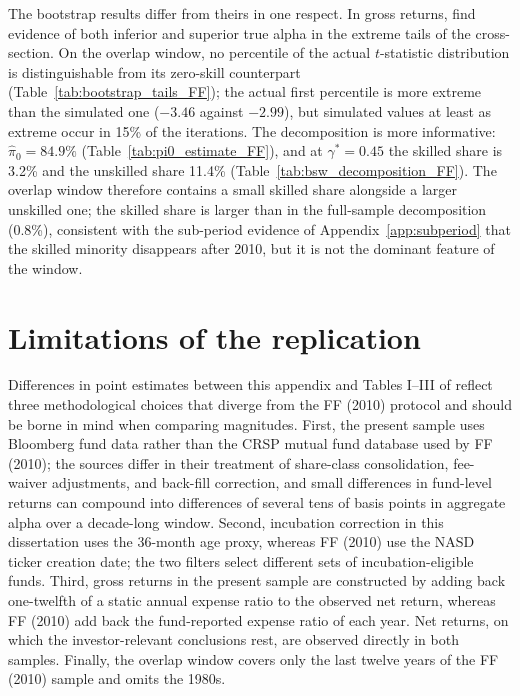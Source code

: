 \documentclass[12pt, oneside]{report}
\begin{document}
The bootstrap results differ from theirs in one respect. In gross
returns, \textcite{FamaFrench2010} find evidence of both inferior and
superior true alpha in the extreme tails of the cross-section. On the
overlap window, no percentile of the actual $t$-statistic distribution
is distinguishable from its zero-skill counterpart
(Table~\ref{tab:bootstrap_tails_FF}); the actual first percentile is more
extreme than the simulated one ($-3.46$ against $-2.99$), but simulated
values at least as extreme occur in 15\% of the iterations. The
\textcite{BarrasScailletWermers2010} decomposition is more informative:
$\hat{\pi}_0 = 84.9\%$ (Table~\ref{tab:pi0_estimate_FF}), and at
$\gamma^* = 0.45$ the skilled share is 3.2\% and the unskilled share 11.4\%
(Table~\ref{tab:bsw_decomposition_FF}). The overlap window therefore
contains a small skilled share alongside a larger unskilled one; the
skilled share is larger than in the full-sample decomposition (0.8\%),
consistent with the sub-period evidence of Appendix~\ref{app:subperiod}
that the skilled minority disappears after 2010, but it is not the
dominant feature of the window.

\section{Limitations of the replication}
\label{sec:ff_limitations}

\noindent Differences in point estimates between this appendix and
Tables I--III of \textcite{FamaFrench2010} reflect three
methodological choices that diverge from the FF (2010) protocol and
should be borne in mind when comparing magnitudes. First, the
present sample uses Bloomberg fund data rather than the CRSP
mutual fund database used by FF (2010); the sources differ in
their treatment of share-class consolidation, fee-waiver
adjustments, and back-fill correction, and small differences in
fund-level returns can compound into differences of several tens of
basis points in aggregate alpha over a decade-long window. Second,
incubation correction in this dissertation uses the
\textcite{Evans2010} 36-month age proxy, whereas FF (2010) use the
NASD ticker creation date; the two filters select different sets of
incubation-eligible funds. Third, gross returns in the present sample
are constructed by adding back one-twelfth of a static annual expense
ratio to the observed net return, whereas FF (2010) add back the
fund-reported expense ratio of each year. Net returns, on which the
investor-relevant conclusions rest, are observed directly in both
samples. Finally, the overlap window covers only the last twelve years of
the FF (2010) sample and omits the 1980s.
\end{document}
